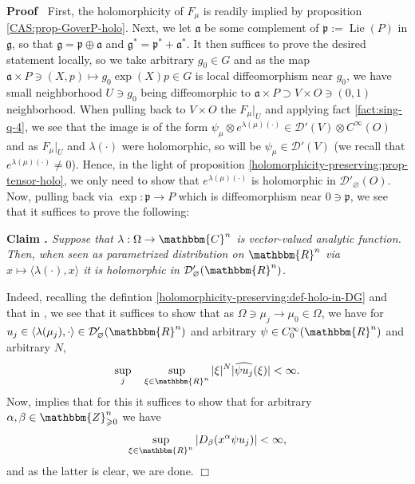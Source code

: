 \documentclass{article}
\newcommand{\assign}{:=}
\newcommand{\tmop}[1]{\ensuremath{\operatorname{#1}}}
\newcommand{\tmtextbf}[1]{{\bfseries{#1}}}
\newcommand{\tmtextit}[1]{{\itshape{#1}}}
\newenvironment{proof}{\noindent\textbf{Proof\ }}{\hspace*{\fill}$\Box$\medskip}
\begin{document}
\begin{proof}
  First, the holomorphicity of $F_{\mu}$ is readily implied by proposition
  \ref{CAS:prop-GoverP-holo}. Next, we let $\mathfrak{a}$ be some complement
  of $\mathfrak{p} \assign \tmop{Lie} (P)$ in $\mathfrak{g}$, so that
  $\mathfrak{g}=\mathfrak{p} \oplus \mathfrak{a}$ and $\mathfrak{g}^{\ast}
  =\mathfrak{p}^{\ast} +\mathfrak{a}^{\ast}$. It then suffices to prove the
  desired statement locally, so we take arbitrary $g_0 \in G$ and as the map
  $\mathfrak{a} \times P \ni (X, p) \mapsto g_0 \exp (X) p \in G$ is local
  diffeomorphism near $g_0$, we have small neighborhood $U \ni g_0$ being
  diffeomorphic to $\mathfrak{a} \times P \supset V \times O \ni (0, 1)$
  neighborhood. When pulling back to $V \times O$ the $F_{\mu} \big|_U$ and
  applying fact \ref{fact:sing-q-4}, we see that the image is of the form
  $\psi_{\mu} \otimes e^{\lambda (\mu) (\cdot)} \in \mathcal{D}' (V) \otimes
  C^{\infty} (O)$ and as $F_{\mu} \big|_U$ and $\lambda (\cdot)$ were
  holomorphic, so will be $\psi_{\mu} \in \mathcal{D}' (V)$ (we recall that
  $e^{\lambda (\mu) (\cdot)} \neq 0$). Hence, in the light of proposition
  \ref{holomorphicity-preserving:prop-tensor-holo}, we only need to show that
  $e^{\lambda (\mu) (\cdot)}$ is holomorphic in $\mathcal{D}'_{\varnothing}
  (O)$. Now, pulling back via $\exp : \mathfrak{p} \rightarrow P$ which is
  diffeomorphism near $0 \ni \mathfrak{p}$, we see that it suffices to prove
  the following:
  
  {\noindent}\tmtextbf{Claim . }\tmtextit{Suppose that $\lambda : \Omega
  \rightarrow \mathbbm{C}^n$ is vector-valued analytic function. Then, when
  seen as parametrized distribution on $\mathbbm{R}^n$ via $x \mapsto \langle
  \lambda (\cdot), x \rangle$ it is holomorphic in $\mathcal{D}'_{\varnothing}
  (\mathbbm{R}^n)$.}{\hspace*{\fill}}{\medskip}
  
  Indeed, recalling the defintion
  \ref{holomorphicity-preserving:def-holo-in-DG} and that in {\cite[def.
  8.2.2]{hormander1983analysis}}, we see that it suffices to show that as
  $\Omega \ni \mu_j \rightarrow \mu_0 \in \Omega$, we have for $u_j \in
  \langle \lambda (\mu_j), \cdot \rangle \in \mathcal{D}'_{\varnothing}
  (\mathbbm{R}^n)$ and arbitrary $\psi \in C^{\infty}_0 (\mathbbm{R}^n)$ and
  arbitrary $N$,
  \[ \sup_j \quad \sup_{\xi \in \mathbbm{R}^n} | \xi |^N | \widehat{\psi u_j}
     (\xi) | < \infty . \]
  Now, {\cite[lemma 7.1.3]{hormander1983analysis}} implies that for this it
  suffices to show that for arbitrary $\alpha, \beta \in
  \mathbbm{Z}^n_{\geqslant 0}$ we have
  \[ \sup_{\xi \in \mathbbm{R}^n} | D_{\beta} (x^{\alpha} \psi u_j) | <
     \infty, \]
  and as the latter is clear, we are done.
\end{proof}
\end{document}
